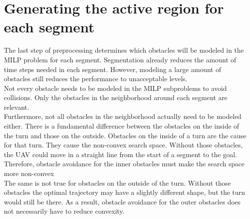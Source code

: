 \section{Generating the active region for each segment}
The last step of preprocessing determines which obstacles will be modeled in the MILP problem for each segment. Segmentation already reduces the amount of time steps needed in each segment. However, modeling a large amount of obstacles still reduces the performance to unacceptable levels. \\
Not every obstacle needs to be modeled in the MILP subproblems to avoid collisions. Only the obstacles in the neighborhood around each segment are relevant. \\
Furthermore, not all obstacles in the neighborhood actually need to be modeled either. There is a fundamental difference between the obstacles on the inside of the turn and those on the outside. Obstacles on the inside of a turn are the cause for that turn. They cause the non-convex search space. Without those obstacles, the UAV could move in a straight line from the start of a segment to the goal. Therefore, obstacle avoidance for the inner obstacles must make the search space more non-convex\\
The same is not true for obstacles on the outside of the turn. Without those obstacles the optimal trajectory may have a slightly different shape, but the turn would still be there. As a result, obstacle avoidance for the outer obstacles does not necessarily have to reduce convexity. \\

